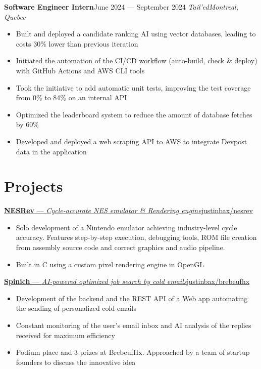 \documentclass{article}
\newcommand{\newrole}[4]{
    {\normalfont\textbf{#1}\hfill#3}
    \newline
    \textit{#2}\hfill\textit{#4}
}
\newcommand{\shortlinkrole}[4]{
    {\href{#3}{\normalfont\textbf{#1} --- \textit{#2}\hfill#4\:\faExternalLink}\vspace*{-4pt}}
}
\newenvironment{bulletpoints}{\begin{itemize}\setlength\itemsep{-0.2em}}{\end{itemize}}
\begin{document}
\newrole{Software Engineer Intern}{Tail'ed}{June 2024 --- September 2024}{Montreal, Quebec}
\begin{bulletpoints}
    \item Built and deployed a candidate ranking AI using vector databases, leading to costs 30\% lower than previous iteration
    \item Initiated the automation of the CI/CD workflow (auto-build, check \& deploy) with GitHub Actions and AWS CLI tools
    \item Took the initiative to add automatic unit tests, improving the test coverage from 0\% to 84\% on an internal API
    \item Optimized the leaderboard system to reduce the amount of database fetches by 60\%
    \item Developed and deployed a web scraping API to AWS to integrate Devpost data in the application
\end{bulletpoints}


\section*{Projects}

\shortlinkrole{NESRev}{Cycle-accurate NES emulator \& Rendering engine}{https://github.com/justinbax/nesrev}{justinbax/nesrev}
\begin{bulletpoints}
    \item Solo development of a Nintendo emulator achieving industry-level cycle accuracy. Features step-by-step execution, debugging tools, ROM file creation from assembly source code and correct graphics and audio pipeline.
    \item Built in C using a custom pixel rendering engine in OpenGL
\end{bulletpoints}

\shortlinkrole{Spinich}{AI-powered optimized job search by cold emails}{https://github.com/justinbax/brebeufhx}{justinbax/brebeufhx}
\begin{bulletpoints}
    \item Development of the backend and the REST API of a Web app automating the sending of personalized cold emails
    \item Constant monitoring of the user's email inbox and AI analysis of the replies received for maximum efficiency
    \item Podium place and 3 prizes at BrebeufHx. Approached by a team of startup founders to discuss the innovative idea
\end{bulletpoints}
\end{document}
